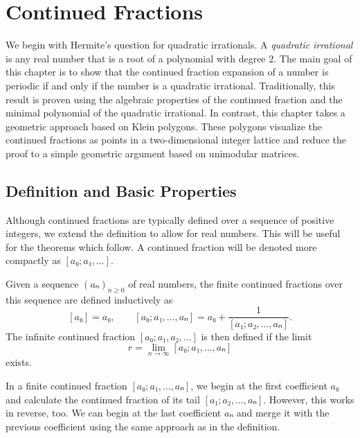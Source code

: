 \chapter{Continued Fractions}
\label{ch:quadratic}

We begin with Hermite's question for quadratic irrationals.
A \emph{quadratic irrational} is any real number
that is a root of a polynomial with degree $2$.
The main goal of this chapter is to show that the continued fraction expansion
of a number is periodic if and only if the number is a quadratic irrational.
Traditionally, this result is proven using the algebraic properties of the
continued fraction and the minimal polynomial of the quadratic irrational.
In contrast, this chapter takes a geometric approach based on Klein polygons.
These polygons visualize the continued fractions as points in a two-dimensional
integer lattice and reduce the proof to a simple geometric argument based on unimodular matrices.

\section{Definition and Basic Properties}
\label{sec:cf-def}

Although continued fractions are typically defined over a sequence of
positive integers, we extend the definition to allow for real numbers.
This will be useful for the theorems which follow.
A continued fraction will be denoted more compactly as $[a₀; a₁, …]$.

\begin{definition}
  \label{def:cont-frac}
  Given a sequence $(aₙ)_{n≥0}$ of real numbers, the finite continued
  fractions over this sequence are defined inductively as
  \[
    [a₀] = a₀, \qquad
    [a₀; a₁, …, aₙ] = a₀ + \frac{1}{[a₁; a₂, …, aₙ]}.
  \]
  The infinite continued fraction $[a₀; a₁, a₂, …]$ is then defined if the limit
  \[
    r = \lim_{n → ∞} [a₀; a₁, …, aₙ]
  \]
  exists.
\end{definition}

In a finite continued fraction $[a₀; a₁, …, aₙ]$,
we begin at the first coefficient $a₀$ and
calculate the continued fraction of its tail $[a₁; a₂, …, aₙ]$.
However, this works in reverse, too.
We can begin at the last coefficient $aₙ$
and merge it with the previous coefficient
using the same approach as in the definition.

